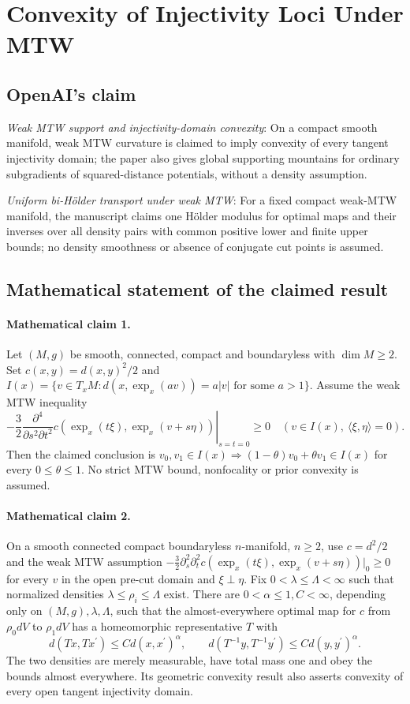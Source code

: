 \documentclass[11pt]{article}
\begin{document}
\section*{Convexity of Injectivity Loci Under MTW}

\subsection{OpenAI's claim}
\textit{Weak MTW support and injectivity-domain convexity}: On a compact smooth manifold, weak MTW curvature is claimed to imply convexity of every tangent injectivity domain; the paper also gives global supporting mountains for ordinary subgradients of squared-distance potentials, without a density assumption.

\textit{Uniform bi-Hölder transport under weak MTW}: For a fixed compact weak-MTW manifold, the manuscript claims one Hölder modulus for optimal maps and their inverses over all density pairs with common positive lower and finite upper bounds; no density smoothness or absence of conjugate cut points is assumed.

\subsection{Mathematical statement of the claimed result}
\paragraph{Mathematical claim 1.} Let $(M,g)$ be smooth, connected, compact and boundaryless with $\dim M\ge2$. Set $c(x,y)=d(x,y)^2/2$ and $I(x)=\{v\in T_xM:d(x,\exp_x(av))=a|v|\text{ for some }a>1\}$. Assume the weak MTW inequality \[-\frac32\left.\frac{\partial^4}{\partial s^2\partial t^2}c(\exp_x(t\xi),\exp_x(v+s\eta))\right|_{s=t=0}\ge0\quad(v\in I(x),\ \langle\xi,\eta\rangle=0).\] Then the claimed conclusion is $v_0,v_1\in I(x)\Longrightarrow(1-\theta)v_0+\theta v_1\in I(x)$ for every $0\le\theta\le1$. No strict MTW bound, nonfocality or prior convexity is assumed.

\paragraph{Mathematical claim 2.} On a smooth connected compact boundaryless $n$-manifold, $n\ge2$, use $c=d^2/2$ and the weak MTW assumption $-\tfrac32\partial_s^2\partial_t^2c(\exp_x(t\xi),\exp_x(v+s\eta))|_0\ge0$ for every $v$ in the open pre-cut domain and $\xi\perp\eta$. Fix $0<\lambda\le\Lambda<\infty$ such that normalized densities $\lambda\le\rho_i\le\Lambda$ exist. There are $0<\alpha\le1,C<\infty$, depending only on $(M,g),\lambda,\Lambda$, such that the almost-everywhere optimal map for $c$ from $\rho_0dV$ to $\rho_1dV$ has a homeomorphic representative $T$ with \[d(Tx,Tx^\prime)\le Cd(x,x^\prime)^\alpha,\qquad d(T^{-1}y,T^{-1}y^\prime)\le Cd(y,y^\prime)^\alpha.\] The two densities are merely measurable, have total mass one and obey the bounds almost everywhere. Its geometric convexity result also asserts convexity of every open tangent injectivity domain.
\end{document}
